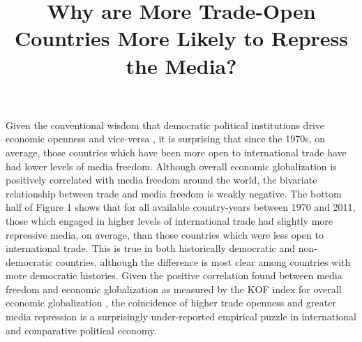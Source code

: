 \documentclass[12pt,a4paper]{article}
\begin{document}
\title{Why are More Trade-Open Countries More Likely to Repress the Media?}
\date{}

\maketitle

Given the conventional wisdom that democratic political institutions drive economic openness \parencite{Milner:2005ci} and vice-versa \parencite{EICHENGREEN:2008gg}, it is surprising that since the 1970s, on average, those countries which have been more open to international trade have had lower levels of media freedom. Although overall economic globalization is positively correlated with media freedom around the world, the bivariate relationship between trade and media freedom is weakly negative. The bottom half of Figure 1 shows that for all available country-years between 1970 and 2011, those which engaged in higher levels of international trade had slightly more repressive media, on average, than those countries which were less open to international trade. This is true in both historically democratic and non-democratic countries, although the difference is most clear among countries with more democratic histories. Given the positive correlation found between media freedom and economic globalization as measured by the KOF index for overall economic globalization \parencite{Dreher:2008dg}, the coincidence of higher trade openness and greater media repression is a surprisingly under-reported empirical puzzle in international and comparative political economy.
\end{document}
